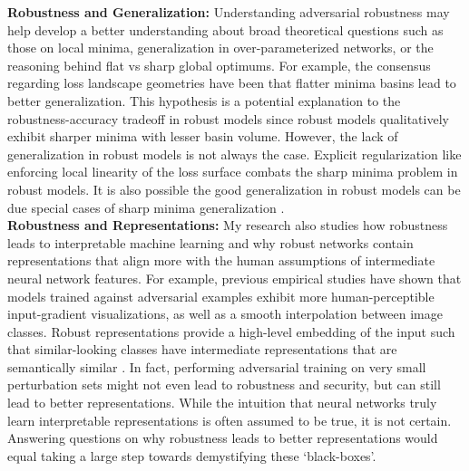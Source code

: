 \documentclass[12pt]{article}
\begin{document}
\textbf{Robustness and Generalization:} Understanding adversarial robustness may help develop a better understanding about broad theoretical questions such as those on local minima, generalization in over-parameterized networks, or the reasoning behind flat vs sharp global optimums. For example, the consensus regarding loss landscape geometries have been that flatter minima basins lead to better generalization. This hypothesis is a potential explanation to the robustness-accuracy tradeoff in robust models \cite{tsipras2018robustness} since robust models qualitatively exhibit sharper minima with lesser basin volume. 
However, the lack of generalization in robust models is not always the case. Explicit regularization like enforcing local linearity of the loss surface combats the sharp minima problem in robust models. It is also possible the good generalization in robust models can be due special cases of sharp minima generalization \cite{10.5555/3305381.3305487}.\\

\textbf{Robustness and Representations:} My research also studies how robustness leads to interpretable machine learning and why robust networks contain representations that align more with the human assumptions of intermediate neural network features. For example, previous empirical studies have shown that models trained against adversarial examples exhibit more human-perceptible input-gradient visualizations, as well as a smooth interpolation between image classes. Robust representations provide a high-level embedding of the input such that similar-looking classes have intermediate representations that are semantically similar \cite{engstrom2019adversarial}. In fact, performing adversarial training on very small perturbation sets might not even lead to robustness and security, but can still lead to better representations. While the intuition that neural networks truly learn interpretable representations is often assumed to be true, it is not certain. Answering questions on why robustness leads to better representations would equal taking a large step towards demystifying these `black-boxes'. \\

\end{document}
